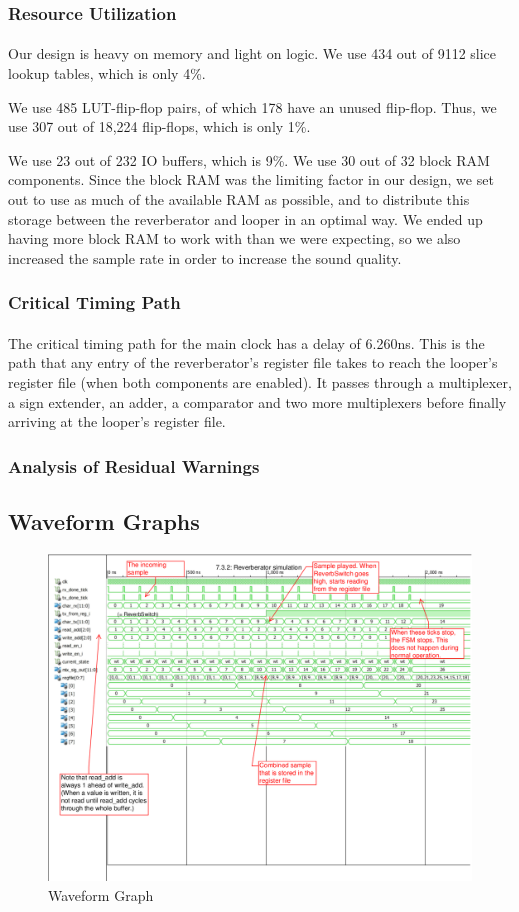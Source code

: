 \documentclass[12pt]{article}
\begin{document}
\subsubsection{Resource Utilization}
\paragraph{}
Our design is heavy on memory and light on logic. We use 434 out of 9112 slice lookup tables, which is only 4\%. 

We use 485 LUT-flip-flop pairs, of which 178 have an unused flip-flop. Thus, we use 307 out of 18,224 flip-flops, which is only 1\%.

We use 23 out of 232 IO buffers, which is 9\%.
We use 30 out of 32 block RAM components. Since the block RAM was the limiting factor in our design, we set out to use as much of the available RAM as possible, and to distribute this storage between the reverberator and looper in an optimal way. We ended up having more block RAM to work with than we were expecting, so we also increased the sample rate in order to increase the sound quality.
\subsubsection{Critical Timing Path}
\paragraph{}
The critical timing path for the main clock has a delay of 6.260ns. This is the path that any entry of the reverberator's register file takes to reach the looper's register file (when both components are enabled). It passes through a multiplexer, a sign extender, an adder, a comparator and two more multiplexers before finally arriving at the looper's register file.
\subsubsection{Analysis of Residual Warnings}
\subsection{Waveform Graphs}
\begin{figure}[!htb]
\centering
\includegraphics[width=1\textwidth, height=0.5\textheight, angle=90]{reverb_sim.eps}
\caption{Waveform Graph}
\end{figure}
\end{document}
